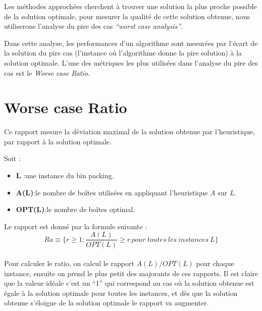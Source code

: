 \documentclass[class=article, crop=false]{standalone}
\begin{document}
Les méthodes approchées cherchent à trouver une solution la plus proche possible de la solution optimale,
pour mesurer la qualité de cette solution obtenue, nous utiliserons l’analyse du pire des cas \emph{“worst case analysis”}.

Dans cette analyse, les performances d’un algorithme sont mesurées par l’écart de la solution du pire cas
(l’instance où l’algorithme donne la pire solution) à la solution optimale.
L’une des métriques les plus utilisées dans l’analyse du pire des cas est le \emph{Worse case Ratio}.

\section*{Worse case Ratio}
Ce rapport mesure la déviation maximal de la solution obtenue par l’heuristique, par rapport à la solution optimale. 

Soit :
\begin{itemize}
    \item \textbf{L} :une instance du bin packing.
    \item \textbf{A(L)}:le nombre de boîtes utilisées en appliquant l’heuristique \emph{A} sur \emph{L}.
    \item \textbf{OPT(L)}:le nombre de boîtes optimal.
\end{itemize}
Le rapport est donné par la formule suivante :\\
\[ Ra\equiv \{r \geq 1 : \frac{A(L)}{OPT(L)} \geq r\, pour\: toutes\: les\: instances\: L\}\]\\
Pour calculer le ratio, on calcul le rapport  $A(L)/OPT(L)$  pour chaque instance, ensuite on prend le plus petit des majorants de ces rapports.
Il est claire que la valeur idéale c’est un “1” qui correspond au cas où la solution obtenue est  égale à la solution optimale pour toutes les instances, et dès que la solution obtenue s’éloigne de la solution optimale le rapport va augmenter.
\end{document}
